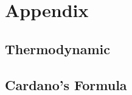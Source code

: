 \documentclass[a4paper,fleqn]{cas-dc}
\begin{document}
%



\clearpage \appendix \label{appendix}
\section{Appendix} 

\subsection{Thermodynamic}
 \label{CH: EOS}

%

%
%

%

\subsection{Cardano's Formula} \label{CH: Cardano}


%

%
\end{document}
